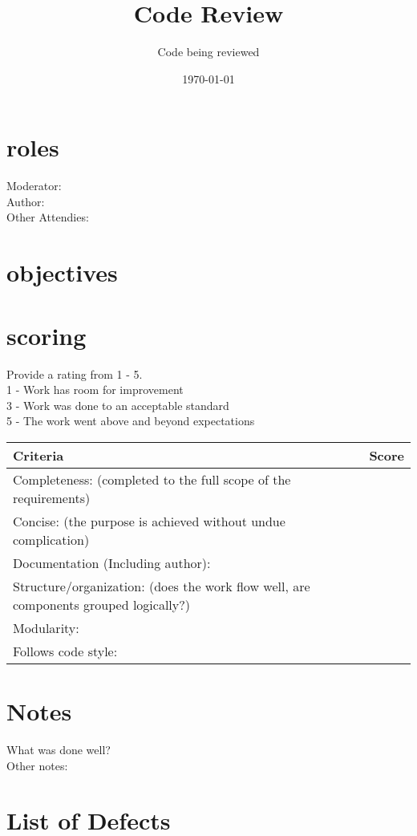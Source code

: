 \documentclass{article}
\title{Code Review}
\author{Code being reviewed}
\date{\today}
\begin{document}
\maketitle

\section{roles}
Moderator: \\
Author: \\
Other Attendies: \\

\section{objectives}


\section{scoring}
    Provide a rating from 1 - 5. \\
    1 - Work has room for improvement \\
    3 - Work was done to an acceptable standard \\
    5 - The work went above and beyond expectations\\

\begin{tabular}{|l|c|}
	\hline
	Criteria & Score\\
	\hline
    Completeness:
    (completed to the full scope of the requirements) & \\
	\hline
    Concise:
    (the purpose is achieved without undue complication) & \\
	\hline
    Documentation (Including author): & \\
    \hline
    Structure/organization:
    (does the work flow well, are components grouped logically?) & \\
    \hline
    Modularity: & \\
    \hline
    Follows code style: & \\
    \hline
\end{tabular}

\section{Notes}
    
What was done well? \\
    
Other notes: \\
    
\pagebreak

\section{List of Defects}
\end{document}
